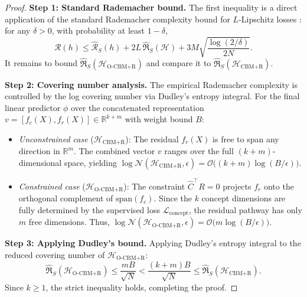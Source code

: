 \documentclass[twoside,11pt]{article}
\begin{document}
\begin{proof}
\textbf{Step 1: Standard Rademacher bound.} The first inequality is a direct application of the standard Rademacher complexity bound for $L$-Lipschitz losses \citep{Bartlett2002}: for any $\delta > 0$, with probability at least $1 - \delta$,
\begin{equation}
    \mathcal{R}(h) \leq \hat{\mathcal{R}}_S(h) + 2L\,\hat{\mathfrak{R}}_S(\mathcal{H}) + 3M\sqrt{\frac{\log(2/\delta)}{2N}}.
\end{equation}
It remains to bound $\hat{\mathfrak{R}}_S(\mathcal{H}_{\text{O-CBM+R}})$ and compare it to $\hat{\mathfrak{R}}_S(\mathcal{H}_{\text{CBM+R}})$.

\textbf{Step 2: Covering number analysis.} The empirical Rademacher complexity is controlled by the log covering number via Dudley's entropy integral. For the final linear predictor $\phi$ over the concatenated representation $v = [f_c(X), f_r(X)] \in \mathbb{R}^{k+m}$ with weight bound $B$:
\begin{itemize}
    \item \textit{Unconstrained case} ($\mathcal{H}_{\text{CBM+R}}$): The residual $f_r(X)$ is free to span any direction in $\mathbb{R}^m$. The combined vector $v$ ranges over the full $(k+m)$-dimensional space, yielding $\log \mathcal{N}(\mathcal{H}_{\text{CBM+R}}, \epsilon) = \mathcal{O}\big((k+m)\log(B/\epsilon)\big)$.
    \item \textit{Constrained case} ($\mathcal{H}_{\text{O-CBM+R}}$): The constraint $\hat{C}^\top R = 0$ projects $f_r$ onto the orthogonal complement of $\text{span}(f_c)$. Since the $k$ concept dimensions are fully determined by the supervised loss $\mathcal{L}_{\text{concept}}$, the residual pathway has only $m$ free dimensions. Thus, $\log \mathcal{N}(\mathcal{H}_{\text{O-CBM+R}}, \epsilon) = \mathcal{O}\big(m\log(B/\epsilon)\big)$.
\end{itemize}

\textbf{Step 3: Applying Dudley's bound.} Applying Dudley's entropy integral \citep{Dudley1967} to the reduced covering number of $\mathcal{H}_{\text{O-CBM+R}}$:
\begin{equation}
    \hat{\mathfrak{R}}_S(\mathcal{H}_{\text{O-CBM+R}}) \leq \frac{mB}{\sqrt{N}} < \frac{(k+m)B}{\sqrt{N}} \leq \hat{\mathfrak{R}}_S(\mathcal{H}_{\text{CBM+R}}).
\end{equation}
Since $k \geq 1$, the strict inequality holds, completing the proof.
\end{proof}
\end{document}
